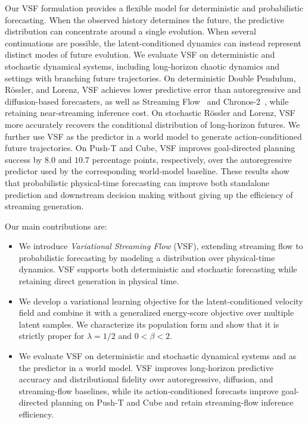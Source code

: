 Our VSF formulation provides a flexible model for deterministic and probabilistic forecasting. When the observed history determines the future, the predictive distribution can concentrate around a single evolution. When several continuations are possible, the latent-conditioned dynamics can instead represent distinct modes of future evolution. We evaluate VSF on deterministic
and stochastic dynamical systems, including long-horizon chaotic dynamics and
settings with branching future trajectories. On deterministic Double Pendulum,
R\"ossler, and Lorenz, VSF achieves lower predictive error than autoregressive
and diffusion-based forecasters, as well as Streaming Flow~\citep{jiang2025streaming}
and Chronos-2~\citep{ansari2025chronos}, while retaining near-streaming inference
cost. On stochastic R\"ossler and Lorenz, VSF more accurately recovers the
conditional distribution of long-horizon futures. We further use VSF as the predictor in a world model to generate action-conditioned future trajectories. On Push-T and Cube, VSF improves goal-directed planning success by
$8.0$ and $10.7$ percentage points, respectively, over the autoregressive
predictor used by the corresponding world-model baseline. These results show
that probabilistic physical-time forecasting can improve both standalone
prediction and downstream decision making without giving up the efficiency of
streaming generation.

Our main contributions are:
%
\begin{itemize}[leftmargin=*]
    \item We introduce \emph{Variational Streaming Flow} (VSF), extending streaming flow to probabilistic forecasting by modeling a distribution over physical-time dynamics. VSF supports both deterministic and stochastic forecasting while retaining direct generation in physical time.

    \item We develop a variational learning objective for the latent-conditioned
    velocity field and combine it with a generalized energy-score objective over
    multiple latent samples. We characterize its population form and show that it
    is strictly proper for $\lambda=1/2$ and $0<\beta<2$.

    \item We evaluate VSF on deterministic and stochastic dynamical systems and
    as the predictor in a world model. VSF improves long-horizon predictive
    accuracy and distributional fidelity over autoregressive, diffusion, and
    streaming-flow baselines, while its action-conditioned forecasts improve
    goal-directed planning on Push-T and Cube and retain streaming-flow inference
    efficiency.
\end{itemize}





